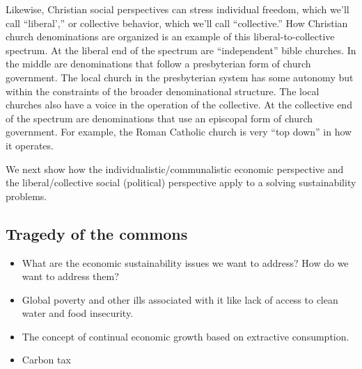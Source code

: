 \documentclass[12pt]{article}
\begin{document}
Likewise, Christian social perspectives can stress individual freedom, which we'll call ``liberal','' or collective behavior, which
we'll call ``collective.'' How Christian church denominations are organized is an example of this liberal-to-collective spectrum.
At the liberal end of the spectrum are ``independent'' bible churches. In the middle are denominations that follow a presbyterian form of church 
government. The local church in the presbyterian system has some autonomy but within the constraints of the broader 
denominational structure. The local churches also have a voice in the operation of the collective. At the collective end of the spectrum 
are denominations that use an episcopal form of church government. For example, the Roman Catholic church is very ``top down'' 
in how it operates.

We next show how the individualistic/communalistic economic perspective and the liberal/collective social (political) perspective
apply to a solving sustainability problems.

\subsection{Tragedy of the commons}
\label{sec:totc}



\begin{itemize}
\item{What are the economic sustainability issues we want to address? How do we want to address them?}
\item{Global poverty and other ills associated with it like lack of access to clean water and food insecurity.}
\item{The concept of continual economic growth based on extractive consumption.}
\item{Carbon tax}
\end{itemize}
%
%
%
\end{document}
